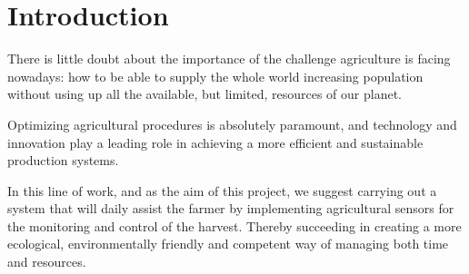 \chapter{Introduction}\label{cap:introduccion}
There is little doubt about the importance of the challenge agriculture is facing nowadays: how to be able to supply the whole world increasing population without using up all the available, but limited, resources of our planet.

Optimizing agricultural procedures is absolutely paramount, and technology and innovation play a leading role in achieving a more efficient and sustainable production systems.

In this line of work, and as the aim of this project, we suggest carrying out a system that will daily assist the farmer by implementing agricultural sensors for the monitoring and control of the harvest. Thereby succeeding in creating a more ecological, environmentally friendly and competent way of managing both time and resources.


